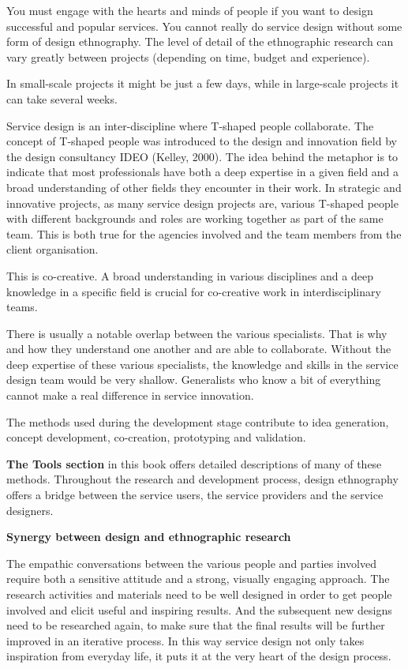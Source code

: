 You must engage with the hearts and minds of people if you want to design successful and popular services. You cannot really do service design without some form of design ethnography. The level of detail of the ethnographic research can vary greatly between projects (depending on time, budget and experience).

In small-scale projects it might be just a few days, while in large-scale projects it can take several weeks.

Service design is an inter-discipline where T-shaped people collaborate. The concept of T-shaped people was introduced to the design and innovation field by the design consultancy IDEO (Kelley, 2000). The idea behind the metaphor is to indicate that most professionals have both a deep expertise in a given field and a broad understanding of other fields they encounter in their work. In strategic and innovative projects, as many service design projects are, various T-shaped people with different backgrounds and roles are working together as part of the same team. This is both true for the agencies involved and the team members from the client organisation.

This is co-creative.
A broad understanding in various disciplines and a deep knowledge in a specific field is crucial for co-creative work in interdisciplinary teams.

There is usually a notable overlap between the various specialists. That is why and how they understand one another and are able to collaborate. Without the deep expertise of these various specialists, the knowledge and skills in the service design team would be very shallow. Generalists who know a bit of everything cannot make a real difference in service innovation.

The methods used during the development stage contribute to idea generation, concept development, co-creation, prototyping and validation.

\textbf{The Tools section} in this book offers detailed descriptions of many of these methods. Throughout the research and development process, design ethnography offers a bridge between the service users, the service providers and the service designers.

\textbf{Synergy between design and ethnographic research}

The empathic conversations between the various people and parties involved require both a sensitive attitude and a strong, visually engaging approach. The research activities and materials need to be well designed in order to get people involved and elicit useful and inspiring results. And the subsequent new designs need to be researched again, to make sure that the final results will be further improved in an iterative process. In this way service design not only takes inspiration from everyday life, it puts it at the very heart of the design process.

